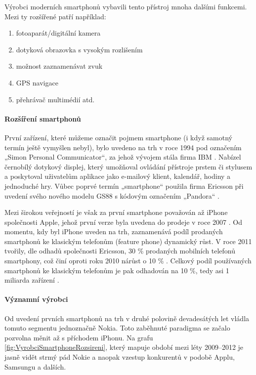 Výrobci moderních smartphonů vybavili tento přístroj mnoha dalšími funkcemi. Mezi ty rozšířené patří například:

\begin{enumerate}
	\item fotoaparát/digitální kamera
	\item dotyková obrazovka s vysokým rozlišením
	\item možnost zaznamenávat zvuk
	\item GPS navigace
	\item přehrávač multimédií atd.
\end{enumerate}

\paragraph{Rozšíření smartphonů}
První zařízení, které můžeme označit pojmem smartphone (i když samotný termín ještě vymyšlen nebyl), bylo uvedeno na trh v roce 1994 pod označením „Simon Personal Communicator“, za jehož vývojem stála firma IBM \cite{simon}. Nabízel černobílý dotykový displej, který umožňoval ovládání přístroje prstem či stylusem a poskytoval uživatelům aplikace jako e-mailový klient, kalendář, hodiny a jednoduché hry. Vůbec poprvé termín „smartphone“ použila firma Ericsson při uvedení svého nového modelu GS88 s kódovým označením „Pandora“ \cite{history_of_the_smartphone}.

Mezi širokou veřejností je však za první smartphone považován až iPhone společnosti Apple, jehož první verze byla uvedena do prodeje v roce 2007 \cite{apple_unveils_iPhone}. Od momentu, kdy byl iPhone uveden na trh, zaznamenává podíl prodaných smartphonů ke klasickým telefonům (feature phone) dynamický růst. V roce 2011 tvořily, dle odhadů společnosti Ericsson, 30 \% prodaných mobilních telefonů smartphony, což činí oproti roku 2010 nárůst o 10 \% \cite{ericsson_report_web}. Celkový podíl používaných smartphonů ke klasickým telefonům je pak odhadován na 10 \%, tedy asi 1 miliarda zařízení \cite{ericsson_report_web}.

\paragraph{Významní výrobci}
Od uvedení prvních smartphonů na trh v druhé polovině devadesátých let vládla tomuto segmentu jednoznačně Nokia. Toto zaběhnuté paradigma se začalo pozvolna měnit až s příchodem iPhonu. Na grafu \ref{fig:VyrobciSmartphoneRozsireni}, který mapuje období mezi léty 2009–2012 je jasně vidět strmý pád Nokie a naopak vzestup konkurentů v podobě Applu, Samsungu a dalších.

